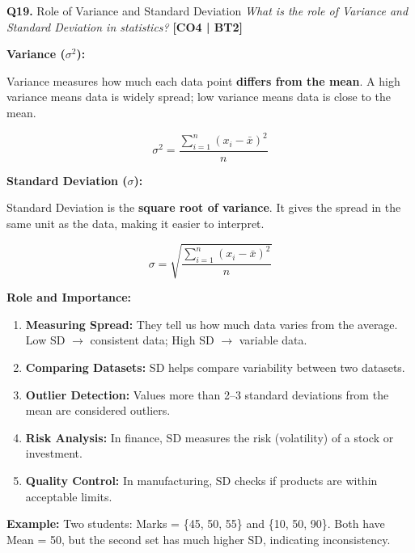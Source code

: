 \documentclass[12pt,a4paper]{article}
\newcommand{\Qno}[1]{\textbf{\color{darkred}Q#1.}}
\newcommand{\term}[1]{\textbf{\color{headingcolor}#1}}
\begin{document}
\vspace{8pt}

\begin{questionbox}{\Qno{19} Role of Variance and Standard Deviation}
\textit{What is the role of Variance and Standard Deviation in statistics?} \hfill \textbf{[CO4 | BT2]}
\end{questionbox}

\begin{answerenv}

\textbf{\color{headingcolor}Variance ($\sigma^2$):}

Variance measures how much each data point \textbf{differs from the mean}. A high variance means data is widely spread; low variance means data is close to the mean.

\[
\sigma^2 = \frac{\sum_{i=1}^{n}(x_i - \bar{x})^2}{n}
\]

\textbf{\color{headingcolor}Standard Deviation ($\sigma$):}

Standard Deviation is the \textbf{square root of variance}. It gives the spread in the same unit as the data, making it easier to interpret.

\[
\sigma = \sqrt{\frac{\sum_{i=1}^{n}(x_i - \bar{x})^2}{n}}
\]

\vspace{6pt}
\textbf{\color{headingcolor}Role and Importance:}
\begin{enumerate}[leftmargin=1.8em, itemsep=4pt]
  \item \term{Measuring Spread:} They tell us how much data varies from the average. Low SD $\to$ consistent data; High SD $\to$ variable data.
  \item \term{Comparing Datasets:} SD helps compare variability between two datasets.
  \item \term{Outlier Detection:} Values more than 2--3 standard deviations from the mean are considered outliers.
  \item \term{Risk Analysis:} In finance, SD measures the risk (volatility) of a stock or investment.
  \item \term{Quality Control:} In manufacturing, SD checks if products are within acceptable limits.
\end{enumerate}

\textbf{\color{headingcolor}Example:}
Two students: Marks = \{45, 50, 55\} and \{10, 50, 90\}. Both have Mean = 50, but the second set has much higher SD, indicating inconsistency.

\end{answerenv}
\end{document}
